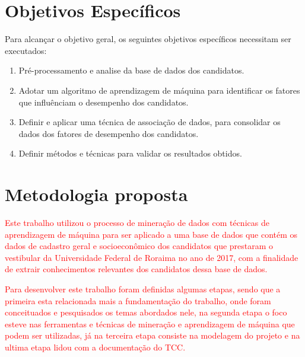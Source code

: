 \section{Objetivos Específicos}

Para alcançar o objetivo geral, os seguintes objetivos específicos necessitam ser executados:


\begin{enumerate}
  \item Pré-processamento e analise da base de dados dos candidatos.
  \item Adotar um algoritmo de aprendizagem de máquina para identificar os fatores que influênciam o desempenho dos candidatos.
  \item Definir e aplicar uma técnica de associação de dados, para consolidar os dados dos fatores de desempenho dos candidatos.
  \item Definir métodos e técnicas para validar os resultados obtidos.
\end{enumerate}

\section{Metodologia proposta}

\textcolor{red}{Este trabalho utilizou o processo de mineração de dados com técnicas de aprendizagem de máquina para ser aplicado a uma base de dados que contém os dados de cadastro geral e socioeconômico dos candidatos que prestaram o vestibular da Universidade Federal de Roraima no ano de 2017, com a finalidade de extrair conhecimentos relevantes dos candidatos dessa base de dados.}

\textcolor{red}{Para desenvolver este trabalho foram definidas algumas etapas, sendo que a primeira esta relacionada mais a fundamentação do trabalho, onde foram conceituados e pesquisados os temas abordados nele, na segunda etapa o foco esteve nas ferramentas e técnicas de mineração e aprendizagem de máquina que podem ser utilizadas, já na terceira etapa consiste na modelagem do projeto e na ultima etapa lidou com a documentação do TCC.}




